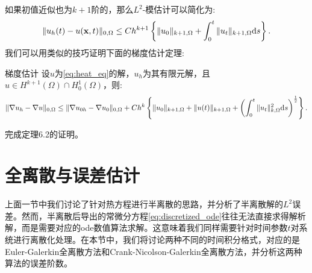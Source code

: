 如果初值近似也为$k+1$阶的，那么$L^{2}$-模估计可以简化为:
\begin{equation}
    \|u_{h}(t)-u(\mathbf{x},t)\|_{0,\Omega}\le Ch^{k+1}\left\{
        \|u_{0}\|_{k+1,\Omega}+\int_{0}^{t}\|u_{t}\|_{k+1,\Omega}\mathrm{d} s
    \right\}.
\end{equation}
我们可以用类似的技巧证明下面的梯度估计定理:
\begin{theorem}{梯度估计}
    设$u$为\eqref{eq:heat_eq}的解，$u_{h}$为其有限元解，且$u\in H^{k+1}(\Omega)\cap H_{0}^{1}(\Omega)$，则:
    \begin{equation}
        \|\nabla u_{h}-\nabla u\|_{0,\Omega}\le\|\nabla u_{0h}-\nabla u_{0}\|_{0,\Omega}+Ch^{k}\left\{\|u_{0}\|_{k+1,\Omega}+\|u(t)\|_{k+1,\Omega}+\left(\int_{0}^{t}\|u_{t}\|_{k,\Omega}^{2}\mathrm{d} s\right)^{\frac{1}{2}}\right\}.
    \end{equation}
\end{theorem}
\begin{exercise}
    完成定理6.2的证明。
\end{exercise}
\section{全离散与误差估计}
上面一节中我们讨论了针对热方程进行半离散的思路，并分析了半离散解的$L^{2}$误差。然而，半离散后导出的常微分方程\eqref{eq:discretized_ode}往往无法直接求得解析解，而是需要对应的ode数值算法求解。这意味着我们同样需要针对时间参数$t$对系统进行离散化处理。在本节中，我们将讨论两种不同的时间积分格式，对应的是Euler-Galerkin全离散方法和Crank-Nicolson-Galerkin全离散方法，并分析这两种算法的误差阶数。
